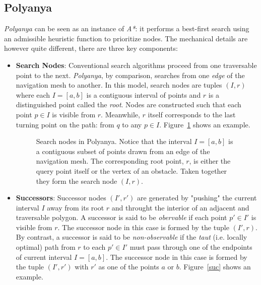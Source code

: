 \subsection{Polyanya}
\textit{Polyanya} can be seen as an instance of \textit{A*}: it performs a best-first search
using an admissible heuristic function to prioritize nodes. The mechanical details are however
quite different, there are three key components:
\begin{itemize}
\item \textbf{Search Nodes}: Conventional  search algorithms proceed from one traversable point
  to the next. \textit{Polyanya}, by comparison, searches from one \textit{edge} of the
  navigation mesh to another. In this model, search nodes are tuples $(I, r)$ where each
  $I=[a,b]$ is a contiguous interval of points and $r$ is a distinguished point called the
  \textit{root}. Nodes are constructed such that each point $p \in I$ is visible from $r$.
  Meanwhile, $r$ itself corresponds to the last turning point on the path: from $q$ to any $p
  \in I$. Figure~\ref{snode} shows an example.

  \begin{figure}[htb]
    \centering
    
    \caption{\small Search nodes in Polyanya. Notice that the interval $I = [a, b]$ is
    a contiguous subset of points drawn from an edge of the navigation mesh.
    The corresponding root point, $r$, is either the query point itself 
    or the vertex of an obstacle. Taken together they form the search node $(I, r)$.}
    \label{snode}
  \end{figure}

\item \textbf{Successors}: Successor nodes $(I', r')$ are generated by "pushing" the current
  interval $I$ away from its root $r$ and throught the interior of an adjacent and traversable
  polygon. A successor is said to be \textit{obervable} if each point $p' \in I'$ is visible
  from $r$. The successor node in this case is formed by the tuple $(I',r)$. By contrast, a
  successor is said to be \textit{non-observable} if the \textit{taut} (i.e. locally optimal)
  path from $r$ to each $p' \in I'$ must pass through one of the endpoints of current interval
  $I=[a,b]$. The successor node in this case is formed by the tuple $(I', r')$ with $r'$ as
  one of the points $a$ or $b$. Figure~\ref{suc} shows an example.
 

\end{itemize}
